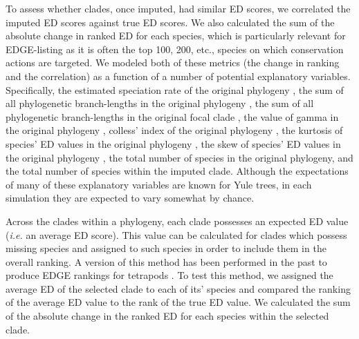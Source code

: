 \documentclass[12pt,english]{article}
\begin{document}
To assess whether clades, once imputed, had similar ED scores, we correlated the
imputed ED scores against true ED scores. We also calculated the sum of the
absolute change in ranked ED for each species, which is particularly relevant
for EDGE-listing as it is often the top 100, 200, etc., species on which
conservation actions are targeted. We modeled both of these metrics (the change
in ranking and the correlation) as a function of a number of potential
explanatory variables. Specifically, the estimated speciation rate of the
original phylogeny \autocite[using \texttt{ape::yule};][]{Paradis2004}, the sum
of all phylogenetic branch-lengths in the original phylogeny \autocite[Faith's
PD;][]{Faith1992}, the sum of all phylogenetic branch-lengths in the original
focal clade \autocite[Faith's PD;][]{Faith1992}, the value of gamma in the
original phylogeny \autocite[using \texttt{phytools::gammatest}][]{Pybus2000,
Revell2012}, colless’ index of the original phylogeny
\autocite[using\texttt{apTreeshape::as.treeshape};][]{Colless1982,
Bortolussi2009}, the kurtosis of species’ ED values in the original phylogeny
\autocite[using \texttt{moments::kurtosis};][]{Komsta2015}, the skew of species’
ED values in the original phylogeny \autocite[using
\texttt{moments::skew};][]{Komsta2015}, the total number of species in the
original phylogeny, and the total number of species within the imputed clade.
Although the expectations of many of these explanatory variables are known for
Yule trees, in each simulation they are expected to vary somewhat by chance.

Across the clades within a phylogeny, each clade possesses an expected ED value
(\emph{i.e.} an average ED score). This value can be calculated for clades which
possess missing species and assigned to such species in order to include them in
the overall ranking. A version of this method has been performed in the past to
produce EDGE rankings for tetrapods \autocite{Gumbs2017}. To test this method,
we assigned the average ED of the selected clade to each of its' species and
compared the ranking of the average ED value to the rank of the true ED value.
We calculated the sum of the absolute change in the ranked ED for each species
within the selected clade.
\end{document}

